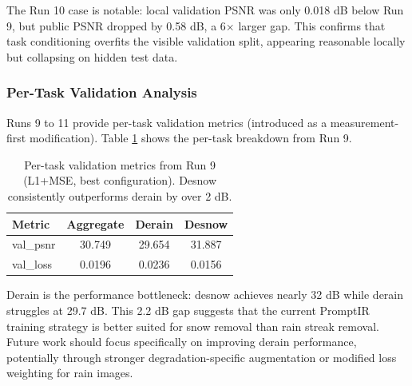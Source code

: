 \documentclass[12pt, a4paper]{article}
\begin{document}
The Run 10 case is notable: local validation PSNR was only 0.018 dB below Run 9, but public PSNR dropped by 0.58 dB, a 6$\times$ larger gap. This confirms that task conditioning overfits the visible validation split, appearing reasonable locally but collapsing on hidden test data.

\subsubsection{Per-Task Validation Analysis}
Runs 9 to 11 provide per-task validation metrics (introduced as a measurement-first modification). Table \ref{tab:pertask} shows the per-task breakdown from Run 9.

\begin{table}[htbp]
\centering
\caption{Per-task validation metrics from Run 9 (L1+MSE, best configuration). Desnow consistently outperforms derain by over 2 dB.}
\label{tab:pertask}
\small
\begin{tabular}{@{}lccc@{}}
\toprule
\textbf{Metric} & \textbf{Aggregate} & \textbf{Derain} & \textbf{Desnow} \\ \midrule
val\_psnr  & 30.749 & 29.654 & 31.887 \\
val\_loss  & 0.0196 & 0.0236 & 0.0156 \\ \bottomrule
\end{tabular}
\end{table}

Derain is the performance bottleneck: desnow achieves nearly 32 dB while derain struggles at 29.7 dB. This 2.2 dB gap suggests that the current PromptIR training strategy is better suited for snow removal than rain streak removal. Future work should focus specifically on improving derain performance, potentially through stronger degradation-specific augmentation or modified loss weighting for rain images.
\end{document}

